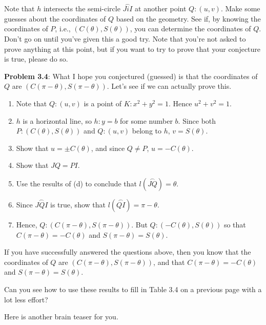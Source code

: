 \documentclass[english]{book}
\newcommand{\arc}[1]{\overset{\frown}{#1} }
\begin{document}
Note that $h$ intersects the semi-circle $\arc{JiI}$ at another point $Q:(u,v)$. Make some guesses about the coordinates of $Q$ based on the geometry. See if, by knowing the coordinates of $P$, i.e., $(C(\theta),S(\theta))$, you can determine the coordinates of $Q$. Don't go on until you've given this a good try. Note that you're not asked to prove anything at this point, but if you want to try to prove that your conjecture is true, please do so.

\vspace{0.3cm}

\textbf{Problem 3.4}: What I hope you conjectured (guessed) is that the coordinates of $Q$ are $(C(\pi-\theta), S(\pi-\theta))$. Let's see if we can actually prove this.
\begin{enumerate}[\hspace{1cm}a)]
  \item Note that $Q:(u,v)$ is a point of $K:x^{2} + y^{2} = 1$. Hence $u^{2} + v^{2} = 1$.
  \item $h$ is a horizontal line, so $h: y = b$ for some number $b$. Since both $P:(C(\theta),S(\theta))$ and $Q:(u,v)$ belong to $h$, $v = S(\theta)$.
  \item Show that $u = \pm C(\theta)$, and since $Q \neq P$, $u = -C(\theta)$.
  \item Show that $JQ = PI$.
  \item Use the results of (d) to conclude that $l(\arc{JQ}) = \theta$.
  \item Since $\arc{JQI}$ is true, show that $l(\arc{QI}) = \pi - \theta$.
  \item Hence, $Q: (C(\pi-\theta), S(\pi-\theta))$. But $Q: (-C(\theta), S(\theta))$ so that $C(\pi-\theta) = -C(\theta)$ and $S(\pi-\theta) = S(\theta)$.
\end{enumerate}
If you have successfully answered the questions above, then you know that the coordinates of $Q$ are $(C(\pi-\theta), S(\pi-\theta))$, and that $C(\pi-\theta) = -C(\theta)$ and $S(\pi-\theta) = S(\theta)$.

Can you see how to use these results to fill in Table 3.4 on a previous page with a lot less effort?

\vspace{0.3cm}

Here is another brain teaser for you.

\vspace{0.6cm}
\end{document}
